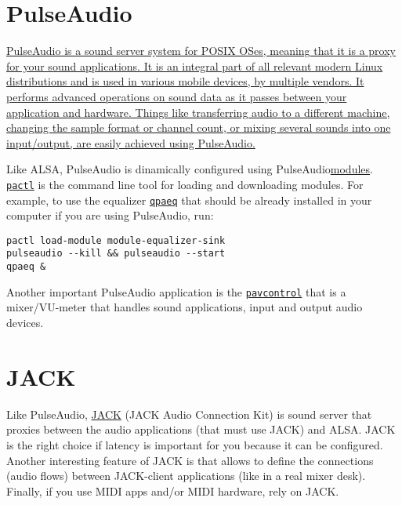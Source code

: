 \section{PulseAudio}

\href{https://www.freedesktop.org/wiki/Software/PulseAudio/}{PulseAudio
  is a sound server system for POSIX OSes, meaning that it is a proxy
  for your sound applications. It is an integral part of all relevant
  modern Linux distributions and is used in various mobile devices, by
  multiple vendors. It performs advanced operations on sound data as
  it passes between your application and hardware. Things like
  transferring audio to a different machine, changing the sample
  format or channel count, or mixing several sounds into one
  input/output, are easily achieved using
  PulseAudio.}~\cite{newmarch2017pulseaudio}

Like ALSA, PulseAudio is dinamically configured using
PulseAudio\href{https://www.freedesktop.org/wiki/Software/PulseAudio/Documentation/User/Modules/}{modules}. \texttt{\href{https://linux.die.net/man/1/pactl}{pactl}}
is the command line tool for loading and downloading modules. For
example, to use the equalizer
\texttt{\href{https://www.freedesktop.org/wiki/Software/PulseAudio/Documentation/User/Equalizer/}{qpaeq}}
that should be already installed in your computer if you are using
PulseAudio, run:

\begin{verbatim}
pactl load-module module-equalizer-sink
pulseaudio --kill && pulseaudio --start
qpaeq &
\end{verbatim}

Another important PulseAudio application is the
\texttt{\href{https://freedesktop.org/software/pulseaudio/pavucontrol/}{pavcontrol}}
that is a mixer/VU-meter that handles sound applications, input and
output audio devices.

\section{JACK}

Like PulseAudio, \href{http://jackaudio.org/}{JACK} (JACK Audio
Connection Kit) is sound server that proxies between the audio
applications (that must use JACK) and ALSA. JACK is the right choice
if latency is important for you because it can be configured. Another
interesting feature of JACK is that allows to define the connections
(audio flows) between JACK-client applications (like in a real mixer
desk). Finally, if you use MIDI apps and/or MIDI hardware, rely on
JACK.

